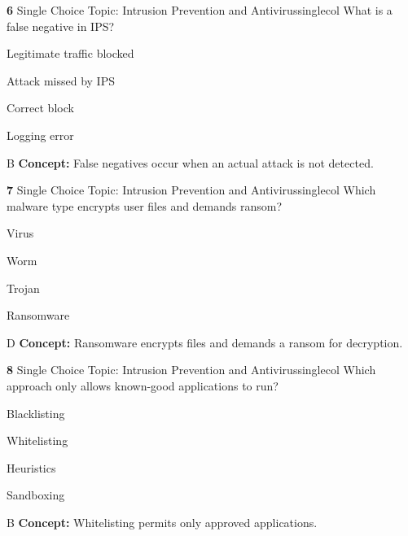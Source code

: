 \documentclass[10pt,a4paper]{article}
\begin{document}
\begin{qcard}{\color{white}\textbf{6} \hfill \small Single Choice \textbar{} Topic: Intrusion Prevention and Antivirus}{singlecol}
What is a false negative in IPS?

\begin{qoptions}
\item Legitimate traffic blocked
\item Attack missed by IPS
\item Correct block
\item Logging error
\end{qoptions}
\begin{explainbox}{B}
\textbf{Concept:} False negatives occur when an actual attack is not detected.
\end{explainbox}
\end{qcard}

\begin{qcard}{\color{white}\textbf{7} \hfill \small Single Choice \textbar{} Topic: Intrusion Prevention and Antivirus}{singlecol}
Which malware type encrypts user files and demands ransom?

\begin{qoptions}
\item Virus
\item Worm
\item Trojan
\item Ransomware
\end{qoptions}
\begin{explainbox}{D}
\textbf{Concept:} Ransomware encrypts files and demands a ransom for decryption.
\end{explainbox}
\end{qcard}

\begin{qcard}{\color{white}\textbf{8} \hfill \small Single Choice \textbar{} Topic: Intrusion Prevention and Antivirus}{singlecol}
Which approach only allows known-good applications to run?

\begin{qoptions}
\item Blacklisting
\item Whitelisting
\item Heuristics
\item Sandboxing
\end{qoptions}
\begin{explainbox}{B}
\textbf{Concept:} Whitelisting permits only approved applications.
\end{explainbox}
\end{qcard}
\end{document}
